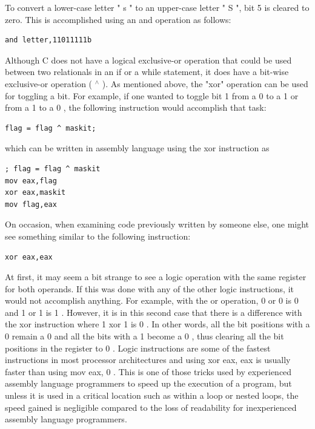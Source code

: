 \documentclass[10pt]{book}
\begin{document}
To convert a lower-case letter " s " to an upper-case letter " S ", bit 5 is cleared to zero. This is accomplished using an and operation as follows:

\begin{verbatim}
and letter,11011111b
\end{verbatim}

Although C does not have a logical exclusive-or operation that could be used between two relationals in an if or a while statement, it does have a bit-wise exclusive-or operation ( ${ }^{\wedge}$ ). As mentioned above, the "xor" operation can be used for toggling a bit. For example, if one wanted to toggle bit 1 from a 0 to a 1 or from a 1 to a 0 , the following instruction would accomplish that task:

\begin{verbatim}
flag = flag ^ maskit;
\end{verbatim}

which can be written in assembly language using the xor instruction as


\begin{verbatim}
; flag = flag ^ maskit
mov eax,flag
xor eax,maskit
mov flag,eax
\end{verbatim}

On occasion, when examining code previously written by someone else, one might see something similar to the following instruction:

\begin{verbatim}
xor eax,eax
\end{verbatim}

At first, it may seem a bit strange to see a logic operation with the same register for both operands. If this was done with any of the other logic instructions, it would not accomplish anything. For example, with the or operation, 0 or 0 is 0 and 1 or 1 is 1 . However, it is in this second case that there is a difference with the xor instruction where 1 xor 1 is 0 . In other words, all the bit positions with a 0 remain a 0 and all the bits with a 1 become a 0 , thus clearing all the bit positions in the register to 0 . Logic instructions are some of the fastest instructions in most processor architectures and using xor eax, eax is usually faster than using mov eax, 0 . This is one of those tricks used by experienced assembly language programmers to speed up the execution of a program, but unless it is used in a critical location such as within a loop or nested loops, the speed gained is negligible compared to the loss of readability for inexperienced assembly language programmers.
\end{document}
